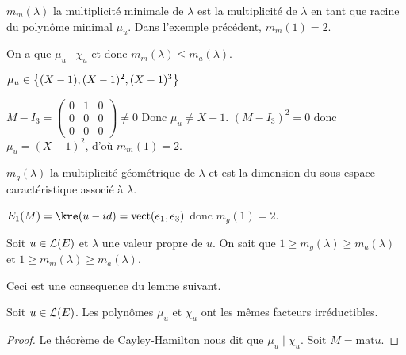 $m_m(\lambda)$ la multiplicité minimale de $\lambda$ est la multiplicité de $\lambda$ en tant que racine du polynôme minimal $\mu_u$.
Dans l'exemple précédent, $m_m(1) = 2$.

On a que $\mu_u \mid \chi_u$ et donc $m_m(\lambda) \leq m_a(\lambda)$.

$\mu_u \in  \left\{(X-1), (X-1)^2, (X-1)^3\right\}$

$M - I_3 = \begin{pmatrix}
		0 & 1 & 0 \\ 0 & 0 & 0 \\ 0 & 0 & 0
	\end{pmatrix} \neq 0$ Donc $\mu_u \neq X - 1$.
$(M - I_3)^2 = 0$ donc $\mu_u = (X-1)^2$, d'où $m_m(1) = 2$.


$m_g(\lambda)$ la multiplicité géométrique de $\lambda$ et est la dimension du sous espace caractéristique associé à $\lambda$.

$E_1 (M) = \kre (u-id) = \vect (e_1, e_3)$ donc $m_g(1) = 2$.


\begin{prop}
	Soit $u \in \mathcal{L}(E)$ et $\lambda$ une valeur propre de $u$. On sait que $ 1 \geq m_g(\lambda) \geq m_a(\lambda)$ et $1 \geq m_m(\lambda) \geq m_a(\lambda)$.

	Ceci est une consequence du lemme suivant.
\end{prop}

\begin{lemma}
	Soit $u \in \mathcal{L}(E)$. Les polynômes $\mu_u$ et $\chi_u$ ont les mêmes facteurs irréductibles.
\end{lemma}

\begin{proof}
	Le théorème de Cayley-Hamilton nous dit que $\mu_u \mid \chi_u$. Soit $M = \text {mat} u$.
\end{proof}








